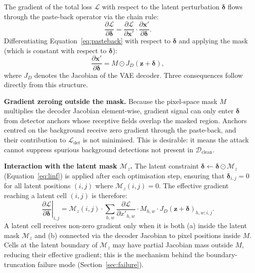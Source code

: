 \documentclass[12pt,a4paper]{report}
\begin{document}
The gradient of the total loss $\mathcal{L}$ with respect to the latent
perturbation $\bm{\delta}$ flows through the paste-back operator via the
chain rule:
\begin{equation}
  \frac{\partial \mathcal{L}}{\partial \bm{\delta}}
  = \frac{\partial \mathcal{L}}{\partial \mathbf{x}'}
    \cdot
    \frac{\partial \mathbf{x}'}{\partial \bm{\delta}}.
  \label{eq:chain}
\end{equation}
Differentiating Equation~\ref{eq:pasteback} with respect to $\bm{\delta}$
and applying the mask (which is constant with respect to $\bm{\delta}$):
\begin{equation}
  \frac{\partial \mathbf{x}'}{\partial \bm{\delta}}
  = M \odot J_D(\mathbf{z} + \bm{\delta}),
  \label{eq:pasteback_grad}
\end{equation}
where $J_D$ denotes the Jacobian of the VAE decoder.
Three consequences follow directly from this structure.

\textbf{Gradient zeroing outside the mask.}
Because the pixel-space mask $M$ multiplies the decoder Jacobian
element-wise, gradient signal can only enter $\bm{\delta}$ from
detector anchors whose receptive fields overlap the masked region.
Anchors centred on the background receive zero gradient through the
paste-back, and their contribution to $\mathcal{L}_\text{det}$
is not minimised.  This is desirable: it means the attack cannot
suppress spurious background detections not present in $\mathcal{D}_\text{clean}$.

\textbf{Interaction with the latent mask $\mathcal{M}_z$.}
The latent constraint $\bm{\delta} \leftarrow \bm{\delta} \odot \mathcal{M}_z$
(Equation~\ref{eq:linf}) is applied after each optimisation step, ensuring
that $\bm{\delta}_{i,j} = 0$ for all latent positions $(i,j)$ where
$\mathcal{M}_z(i,j) = 0$.  The effective gradient reaching a latent cell
$(i,j)$ is therefore:
\begin{equation}
  \left.\frac{\partial \mathcal{L}}{\partial \bm{\delta}}\right|_{i,j}
  = \mathcal{M}_z(i,j)
    \cdot \sum_{h,w} \frac{\partial \mathcal{L}}{\partial x'_{h,w}}
    \cdot M_{h,w} \cdot J_D(\mathbf{z}+\bm{\delta})_{h,w;i,j}.
  \label{eq:effective_grad}
\end{equation}
A latent cell receives non-zero gradient only when it is both
(a) inside the latent mask $\mathcal{M}_z$ and (b) connected via the
decoder Jacobian to pixel positions inside $M$.  Cells at the latent
boundary of $\mathcal{M}_z$ may have partial Jacobian mass outside $M$,
reducing their effective gradient; this is the mechanism behind the
boundary-truncation failure mode (Section~\ref{sec:failure}).
\end{document}
